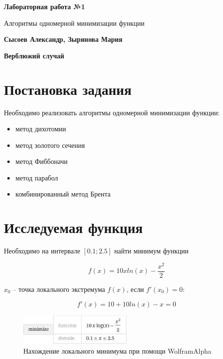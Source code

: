 \documentclass[12pt]{article}
\begin{document}
\begin{titlepage}
   \begin{center}
       \vspace*{1cm}

       \textbf{Лабораторная работа №1}

       \vspace{0.5cm}
        Алгоритмы одномерной минимизации функции
            
       \vspace{1.5cm}

       \textbf{Сысоев Александр, Зырянова Мария}
       
       \textbf{Верблюжий случай}

       \vfill
            
   \end{center}
\end{titlepage}

\section{Постановка задания}

Необходимо реализовать алгоритмы одномерной минимизации функции:

\begin{itemize}
\item метод дихотомии
\item метод золотого сечения
\item метод Фиббоначи
\item метод парабол
\item комбинированный метод Брента
\end{itemize}

\section{Исследуемая функция}

Необходимо на интервале $[0.1; 2.5]$ найти минимум функции 

\begin{equation*}
f(x)=10xln(x)-\frac{x^2}{2}
\end{equation*}

$x_0$ -- точка локального экстремума $f(x)$, если $f'(x_0) = 0$:

\begin{equation*}
f'(x)=10+10ln(x)-x=0
\end{equation*}

\begin{figure}[h]
\centering
\includegraphics[width=0.5\textwidth]{images/problem.jpg}
\caption{Нахождение локального минимума при помощи WolframAlpha}
\end{figure}
\end{document}
